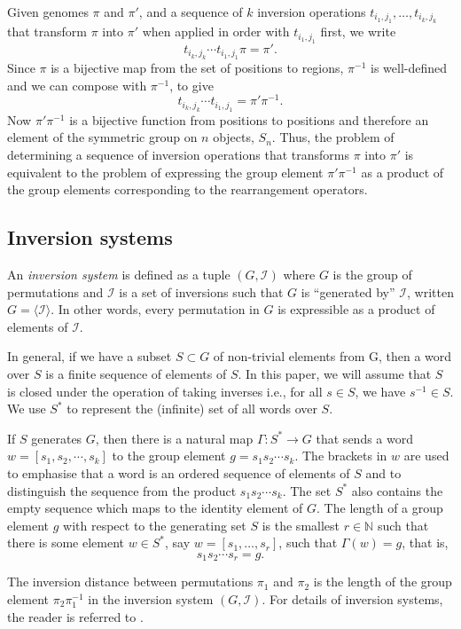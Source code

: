 \documentclass[12pt,a4paper]{amsart}
\newcommand{\invset}{\mathcal{I}}
\newcommand{\tij}[1]{t_{#1}}
\numberwithin{equation}{section}
\begin{document}
Given genomes $\pi$ and $\pi'$, and a sequence of $k$ inversion operations $t_{i_1,j_1},\dots,t_{i_k,j_k}$ that transform $\pi$ into $\pi'$ when applied in order with $t_{i_1,j_1}$ first, we write
\[\tij{i_k, j_k} \cdots \tij{i_1, j_1}\pi = \pi'.\]
% 
Since $\pi$ is a bijective map from the set of positions to regions, $\pi^{-1}$ is well-defined and we can compose with $\pi^{-1}$, to give
\[\tij{i_k, j_k} \cdots \tij{i_1, j_1}= \pi' \pi^{-1}.\]
%
Now $\pi' \pi^{-1}$ is a bijective function from positions to positions and therefore an element of the symmetric group on $n$ objects, $S_n$. Thus, the problem of determining a sequence of inversion operations that transforms $\pi$ into $\pi'$ is equivalent to the problem of expressing the group element $\pi'\pi^{-1}$ as a product of the group elements corresponding to the rearrangement operators.

\subsection*{Inversion systems}

An \emph{inversion system} is defined as a tuple $(G, \invset)$ where $G$ is the group of permutations and $\invset$ is a set of inversions such that $G$ is ``generated by'' $\invset$, written $G = \langle \invset \rangle$. In other words, every permutation in $G$ is expressible as a product of elements of $\invset$. 

In general, if we have a subset $S \subset G$ of non-trivial elements from G, then a word over $S$ is a finite sequence of elements of $S$. In this paper, we will assume that $S$ is closed under the operation of taking inverses i.e., for all $s \in S$, we have $s^{-1} \in S$.  We use $S^*$ to represent the (infinite) set of all words over $S$. 

If $S$ generates $G$, then there is a natural map $\Gamma: S^* \rightarrow G$ that sends a word $w = [s_1, s_2,  \cdots ,s_k]$ to the group element $g = s_1 s_2 \cdots s_k$.
The brackets in $w$ are used to emphasise that a word is an ordered sequence of elements of $S$ and to distinguish the sequence from the product $s_1s_2 \cdots s_k$. The set $S^*$ also contains the empty sequence which maps to the identity element of $G$. The length of a group element $g$ with respect to the generating set $S$ is the smallest $r \in \mathbb{N}$ such that there is some element $w \in S^*$, say $w = [s_1, \hdots ,s_r]$, such that $\Gamma(w) = g$, that is, 
\[ s_1 s_2 \cdots s_r = g.\]


The inversion distance between permutations $\pi_1$ and $\pi_2$ is the length of the group element $\pi_2 \pi_1^{-1}$ in the inversion system $(G, \invset)$. For details of inversion systems, the reader is referred to \citet{egrinagy2013group}. 
\end{document}
